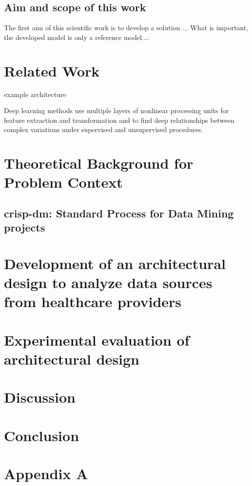 \section{Aim and scope of this work}

The first aim of this scientific work is to develop a solution ...
What is important, the developed model is only a reference model....


\chapter{Related Work}\label{relatedwork}


example architecture

Deep learning methods use multiple layers of nonlinear processing units for feature extraction and transformation and to find deep relationships between complex variations under supervised and unsupervised procedures.


\chapter{Theoretical Background for Problem Context}\label{background}
\section{\ac{crisp-dm}: Standard Process for Data Mining projects}


\chapter{Development of an architectural design to analyze data sources from healthcare providers}


\chapter{Experimental evaluation of architectural design}

\chapter{Discussion}

\chapter{Conclusion}




\printbibliography[heading=bibintoc]

\chapter{Appendix A}\label{appendix a}

%


